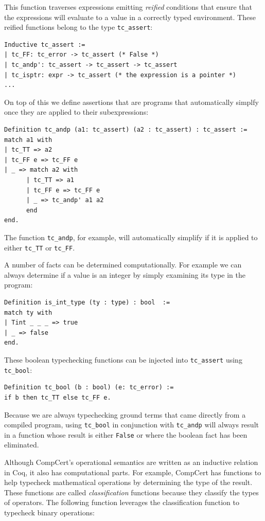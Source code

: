 \documentclass{puthesis}
\begin{document}
\noindent This function traverses expressions emitting \emph{reified}
conditions that ensure that the expressions will evaluate to a value
in a correctly typed environment. These reified functions belong to
the type \lstinline|tc_assert|:

\begin{lstlisting}
Inductive tc_assert :=
| tc_FF: tc_error -> tc_assert (* False *)
| tc_andp': tc_assert -> tc_assert -> tc_assert
| tc_isptr: expr -> tc_assert (* the expression is a pointer *)
...
\end{lstlisting}

On top of this we define assertions that are programs that
automatically simplfy once they are applied to their subexpressions:

\begin{lstlisting}
Definition tc_andp (a1: tc_assert) (a2 : tc_assert) : tc_assert :=
match a1 with
| tc_TT => a2
| tc_FF e => tc_FF e
| _ => match a2 with
      | tc_TT => a1 
      | tc_FF e => tc_FF e
      | _ => tc_andp' a1 a2
      end
end. 
\end{lstlisting}

The function \lstinline|tc_andp|, for example, will automatically
simplify if it is applied to either \lstinline|tc_TT| or
\lstinline|tc_FF|. 

A number of facts can be determined computationally. For example we
can always determine if a value is an integer by simply examining its
type in the program: 

\begin{lstlisting}
Definition is_int_type (ty : type) : bool  := 
match ty with
| Tint _ _ _ => true
| _ => false
end.
\end{lstlisting}

These boolean typechecking functions can be injected into
\lstinline|tc_assert| using \lstinline|tc_bool|:

\begin{lstlisting}
Definition tc_bool (b : bool) (e: tc_error) :=
if b then tc_TT else tc_FF e.
\end{lstlisting}

Because we are always typechecking ground terms that came directly
from a compiled program, using \lstinline|tc_bool| in conjunction with
\lstinline|tc_andp| will always result in a function whose result is
either \lstinline|False| or where the boolean fact has been eliminated.

Although CompCert's operational semantics are written as an inductive
relation in Coq, it also has computational parts. For example,
CompCert has functions to help typecheck mathematical
operations by determining the type of the result. These functions are
called \emph{classification} functions because they classify the types
of operators. The following
function leverages the classification function to typecheck binary
operations:
\end{document}
